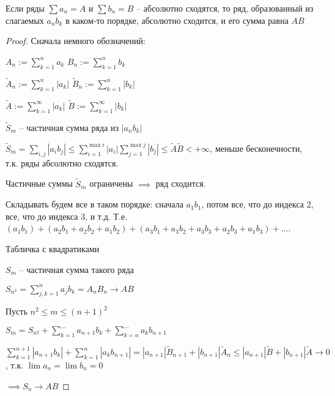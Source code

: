 \begin{theorem}[Коши] \thmslashn
	
	Если ряды $\sum a_n = A$ и $\sum b_n = B$ -- абсолютно сходятся, то ряд, образованный из слагаемых $a_nb_k$ в каком-то порядке, абсолютно сходится, и его сумма равна $AB$
\end{theorem}

\begin{proof} \thmslashn
	
	Сначала немного обозначений:

	$A_n := \sum\limits_{k = 1}^{n} a_k$ $B_n:= \sum\limits_{k=1}^{n}b_k$
	
	$\tilde{A}_n := \sum\limits_{k = 1}^{n}\left|a_k\right|$ $\tilde{B}_n := \sum\limits_{k=1}^{n}\left|b_k\right|$
	
	$\tilde{A} := \sum\limits_{k = 1}^{\infty}\left|a_k\right|$ $\tilde{B} := \sum\limits_{k=1}^{\infty}\left|b_k\right|$
	
	
	$\tilde{S}_m$ -- частичная сумма ряда из $\left|a_nb_k\right|$
	
	$\tilde{S}_m = \sum\limits_{i, j} \left|a_ib_j\right| \le \sum\limits_{i = 1}^{\max{i}}\left|a_i\right|\sum\limits_{j = 1}^{\max{j}}\left|b_j\right| \le \tilde{A}\tilde{B} < +\infty$, меньше бесконечности, т.к. ряды абсолютно сходятся.
	
	Частичные суммы $\tilde{S}_m$ ограничены $\implies $ ряд сходится.
	
	Складывать будем все в таком порядке: сначала $a_1b_1$, потом все, что до индекса $2$, все, что до индекса $3$, и т.д. Т.е. $(a_1b_1) + (a_2b_1 + a_2b_2 + a_1b_2) + (a_3b_1 + a_3b_2 + a_3b_3 + a_2b_3 + a_1b_3) + ...$.
	
	\TODO Табличка с квадратиками 
	
	$S_m$ -- частичная сумма такого ряда
	
	$S_{n^2} = \sum\limits_{j,k=1}^{n} a_j b_k = A_n B_n \to AB$
	
	Пусть $n^2 \le m \le (n+1)^2$
	
	$S_m = S_{n^2} + \sum\limits_{k=1}^{...}a_{n+1}b_k + \sum\limits_{k = n}^{...}a_kb_{n+1}$
	
	$\sum\limits_{k=1}^{n+1}\left|a_{n+1}b_k\right| + \sum\limits_{k=1}^{n}\left|a_kb_{n+1}\right| = \left|a_{n+1}\right|\tilde{B}_{n+1} + \left|b_{n+1}\right|\tilde{A}_{n} \le \left|a_{n+1}\right|\tilde{B} + \left|b_{n+1}\right|\tilde{A} \to 0$, т.к. $\lim a_n = \lim b_n = 0$
	
	$\implies S_n \to AB$
\end{proof}

